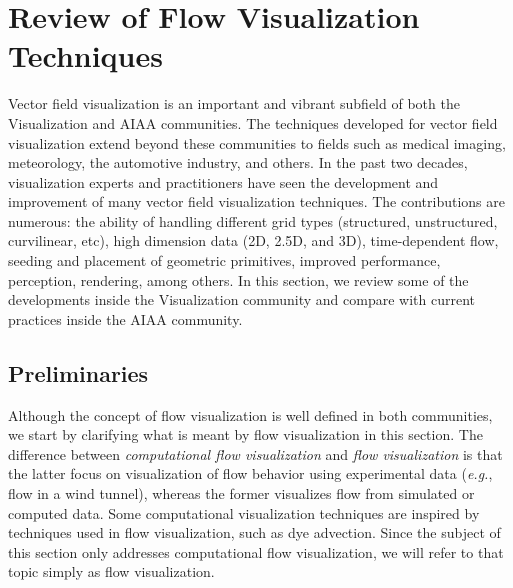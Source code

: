 \section{Review of Flow Visualization Techniques}
\label{sec:flowvis}


Vector field visualization is an important and vibrant subfield of both the Visualization and AIAA communities.
%
The techniques developed for vector field visualization extend beyond these communities to fields such as medical imaging, meteorology, the automotive industry, and others.
%
In the past two decades, visualization experts and practitioners have seen the development and improvement of many vector field visualization techniques.
%
The contributions are numerous: the ability of handling different grid types (structured, unstructured, curvilinear, etc), high dimension data (2D, 2.5D, and 3D), time-dependent flow, seeding and placement of geometric primitives, improved performance, perception, rendering, among others.
%
In this section, we review some of the developments inside the Visualization community and compare with current practices inside the AIAA community.

\subsection{Preliminaries}

Although the concept of flow visualization is well defined in both communities, we start by clarifying what is meant by flow visualization in this section.
%
The difference between \emph{computational flow visualization} and \emph{flow visualization} is that the latter focus on visualization of flow behavior using experimental data (\emph{e.g.}, flow in a wind tunnel), whereas the former visualizes flow from simulated or computed data. 
%
Some computational visualization techniques are inspired by techniques used in flow visualization, such as dye advection. 
%
Since the subject of this section only addresses computational flow visualization, we will refer to that topic simply as flow visualization.

